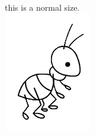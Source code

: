 \documentclass{article}
\begin{document}
this is a normal size.\\
\includegraphics{ant.png}
\end{document}
